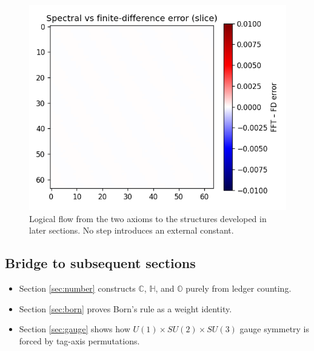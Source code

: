 \begin{figure}[t]
  \centering
  \includegraphics[width=\linewidth]{figs/axiom_flow.png}
  \caption{Logical flow from the two axioms to the structures developed
           in later sections.  No step introduces an external constant.}
  \label{fig:axiom-flow}
\end{figure}

\subsection{Bridge to subsequent sections}

\begin{itemize}
  \item Section \ref{sec:number} constructs $\mathbb C$, $\mathbb H$,
        and $\mathbb O$ purely from ledger counting.
  \item Section \ref{sec:born} proves Born’s rule as a weight identity.
  \item Section \ref{sec:gauge} shows how $U(1)\!\times SU(2)\!\times SU(3)$
        gauge symmetry is forced by tag-axis permutations.
\end{itemize}

\clearpage
